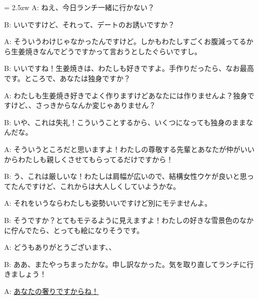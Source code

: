 \documentclass[11pt]{amsart}
\title{}
\author{}
\newenvironment{hangall}[1]{\hangindent = 2.5zw\everypar{\hangindent = 2.5zw}}{}
\begin{document}
\maketitle
\begin{hangall}{}%
A: ねえ、今日ランチ一緒に行かない？

B: いいですけど、それって、デートのお誘いですか？

A: そういうわけじゃなかったんですけど。しかもわたしすごくお腹減ってるから生姜焼きなんでどうですかって言おうとしたぐらいですし。

B: いいですね！生姜焼きは、わたしも好きですよ。手作りだったら、なお最高です。ところで、あなたは独身ですか？

A: わたしも生姜焼き好きでよく作りますけどあなたには作りませんよ？独身ですけど、、さっきからなんか変じゃありません？

B: いや、これは失礼！こういうことするから、いくつになっても独身のままなんだな。

A: そういうところだと思いますよ！わたしの尊敬する先輩とあなたが仲がいいからわたしも親しくさせてもらってるだけですから！

B: う、これは厳しいな！わたしは肩幅が広いので、結構女性ウケが良いと思ってたんですけど、これからは大人しくしていようかな。

A: それをいうならわたしも姿勢いいですけど別にモテませんよ。

B: そうですか？とてもモテるように見えますよ！わたしの好きな雪景色のなかに佇んでたら、とっても絵になりそうです。

A: どうもありがとうございます、、

B: ああ、またやっちまったかな。申し訳なかった。気を取り直してランチに行きましょう！

A: \ul{あなたの奢りですからね！}\end{hangall}
\end{document}
